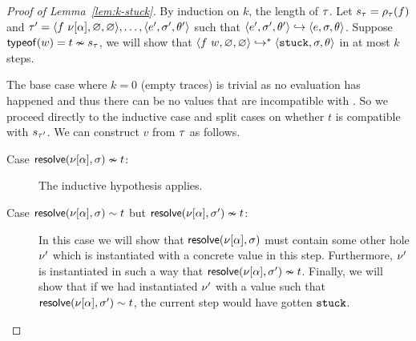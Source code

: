 \begin{proof}[Proof of Lemma~\ref{lem:k-stuck}]
  By induction on $k$, the length of $\tau$. Let $s_{\tau} = \rho_{\tau}(f)$ and
  $\tau' = \langle f\ \nu[\alpha], \varnothing, \varnothing \rangle,\ldots,\langle e', \sigma', \theta' \rangle$
  such that $\langle e', \sigma', \theta' \rangle \hookrightarrow \langle e, \sigma, \theta \rangle$.
  Suppose $\mathsf{typeof}(w) = {t \nsim s_{\tau}}$, we
  will show that $\langle f\ w, \varnothing, \varnothing \rangle \hookrightarrow^{*} \langle \mathtt{stuck}, \sigma, \theta \rangle{}$
  in at most $k$ steps.

  The base case where $k = 0$ (\ie empty traces) is trivial as no
  evaluation has happened and thus there can be no values that are
  incompatible with . So we proceed directly to the
  inductive case and split cases on whether $t$ is compatible with
  $s_{\tau'}$.
  We can construct $v$ from $\tau$ as follows.
  \begin{description}
  \item[Case $\mathsf{resolve}(\nu[\alpha], \sigma) \nsim t$:]
    The inductive hypothesis applies.
  \item[Case $\mathsf{resolve}(\nu[\alpha], \sigma) \sim t$
        but  $\mathsf{resolve}(\nu[\alpha], \sigma') \nsim t$:]
    In this case we will show that $\mathsf{resolve}(\nu[\alpha], \sigma)$
    must contain some other hole $\nu'$ which is instantiated with a
    concrete value in this step.
    Furthermore, $\nu'$ is instantiated in such a way that
    $\mathsf{resolve}(\nu[\alpha], \sigma') \nsim t$.
    Finally, we will show that if we had instantiated $\nu'$ with a
    value such that
    $\mathsf{resolve}(\nu[\alpha], \sigma') \sim t$, the current
    step would have gotten $\mathtt{stuck}$.


\end{description}
\end{proof}
